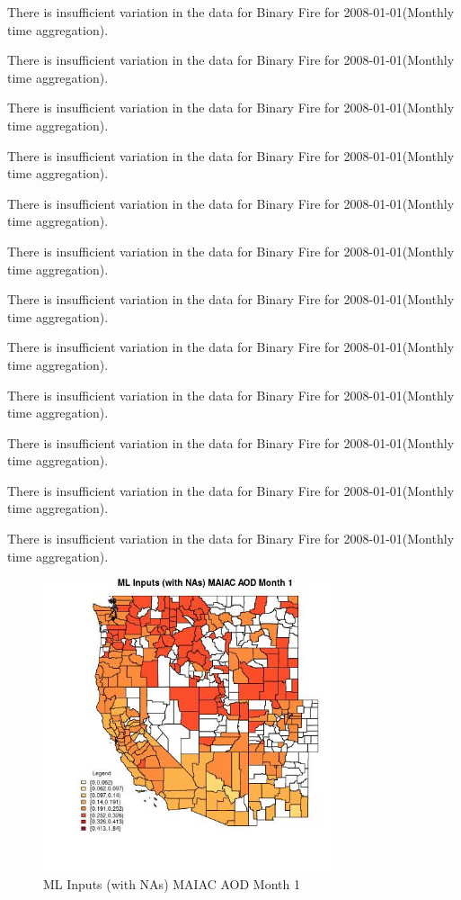 There is insufficient variation in the data for Binary Fire for 2008-01-01(Monthly time aggregation). 
 

There is insufficient variation in the data for Binary Fire for 2008-01-01(Monthly time aggregation). 
 

There is insufficient variation in the data for Binary Fire for 2008-01-01(Monthly time aggregation). 
 

There is insufficient variation in the data for Binary Fire for 2008-01-01(Monthly time aggregation). 
 

There is insufficient variation in the data for Binary Fire for 2008-01-01(Monthly time aggregation). 
 

There is insufficient variation in the data for Binary Fire for 2008-01-01(Monthly time aggregation). 
 

There is insufficient variation in the data for Binary Fire for 2008-01-01(Monthly time aggregation). 
 

There is insufficient variation in the data for Binary Fire for 2008-01-01(Monthly time aggregation). 
 

There is insufficient variation in the data for Binary Fire for 2008-01-01(Monthly time aggregation). 
 

There is insufficient variation in the data for Binary Fire for 2008-01-01(Monthly time aggregation). 
 

There is insufficient variation in the data for Binary Fire for 2008-01-01(Monthly time aggregation). 
 

There is insufficient variation in the data for Binary Fire for 2008-01-01(Monthly time aggregation). 
 

\begin{figure} 
\centering  
\includegraphics[width=0.77\textwidth]{Code_Outputs/Report_ML_input_PM25_Step4_part_f_de_duplicated_aveswNAs_CountyMAIAC_AODmedianMonth1.jpg} 
\caption{\label{fig:Report_ML_input_PM25_Step4_part_f_de_duplicated_aveswNAsCountyMAIAC_AODmedianMonth1}ML Inputs (with NAs) MAIAC AOD Month 1} 
\end{figure} 
 

